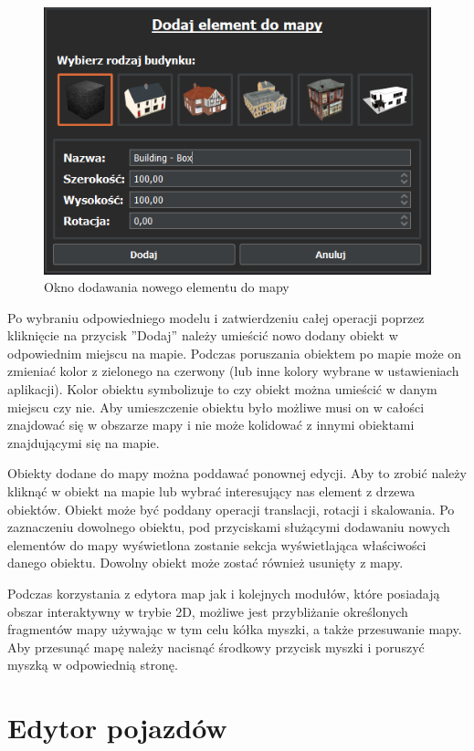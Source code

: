 \documentclass[a4paper,11pt,twoside]{report}
\theoremstyle{definition}
\begin{document}
\begin{figure}[h!]
\centering
\includegraphics[scale=0.9]{instructionAddMapElement}
\caption[Okno dodawania nowego elementu do mapy]{Okno dodawania nowego elementu do mapy}
\end{figure}

Po wybraniu odpowiedniego modelu i zatwierdzeniu całej operacji poprzez kliknięcie na przycisk ''Dodaj'' należy umieścić nowo dodany obiekt w odpowiednim miejscu na mapie. Podczas poruszania obiektem po mapie może on zmieniać kolor z zielonego na czerwony (lub inne kolory wybrane w ustawieniach aplikacji). Kolor obiektu symbolizuje to czy obiekt można umieścić w danym miejscu czy nie. Aby umieszczenie obiektu było możliwe musi on w całości znajdować się w obszarze mapy i nie może kolidować z innymi obiektami znajdującymi  się na mapie.

Obiekty dodane do mapy można poddawać ponownej edycji. Aby to zrobić należy kliknąć w obiekt na mapie lub wybrać interesujący nas element z drzewa obiektów. Obiekt może być poddany operacji translacji, rotacji i skalowania. Po zaznaczeniu dowolnego obiektu, pod przyciskami służącymi dodawaniu nowych elementów do mapy wyświetlona zostanie sekcja wyświetlająca właściwości danego obiektu. Dowolny obiekt może zostać również usunięty z mapy.

Podczas korzystania z edytora map jak i kolejnych modułów, które posiadają obszar interaktywny w trybie 2D, możliwe jest przybliżanie określonych fragmentów mapy używając w tym celu kółka myszki, a także przesuwanie mapy. Aby przesunąć mapę należy nacisnąć środkowy przycisk myszki i poruszyć myszką w odpowiednią stronę.

\section{Edytor pojazdów}
\end{document}

